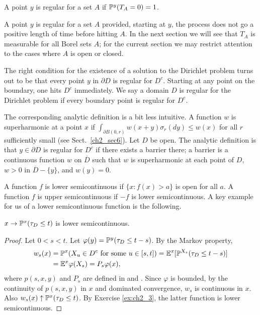 \begin{definition}\label{def:ch2_1.9}
A point $y$ is regular for a set $A$ if $\P^y(T_A = 0) = 1$.
\end{definition}

A point $y$ is regular for a set $A$ provided, starting at $y$, the process does not go a positive length of time before hitting $A$. In the next section we will see that $T_A$ is measurable for all Borel sets $A$; for the current section we may restrict attention to the cases where $A$ is open or closed.

The right condition for the existence of a solution to the Dirichlet problem turns out to be that every point $y$ in $\partial D$ is regular for $D^c$. Starting at any point on the boundary, one hits $D^c$ immediately. We say a domain $D$ is regular for the Dirichlet problem if every boundary point is regular for $D^c$.

The corresponding analytic definition is a bit less intuitive. A function $w$ is superharmonic at a point $x$ if $\int_{\partial B(0,r)} w(x + y)\sigma_r(dy) \leq w(x)$ for all $r$ sufficiently small (see Sect.\ \ref{ch2_sec6}). Let $D$ be open. The analytic definition is that $y \in \partial D$ is regular for $D^c$ if there exists a barrier there; a barrier is a continuous function $w$ on $\overline{D}$ such that $w$ is superharmonic at each point of $D$, $w > 0$ in $\overline{D} - \{y\}$, and $w(y) = 0$.

A function $f$ is lower semicontinuous if $\{x : f(x) > a\}$ is open for all $a$. A function $f$ is upper semicontinuous if $-f$ is lower semicontinuous. A key example for us of a lower semicontinuous function is the following.

\begin{proposition}\label{prop:ch2_1.10}
$x \to \P^x(\tau_D \leq t)$ is lower semicontinuous.
\end{proposition}

\begin{proof}
Let $0 < s < t$. Let $\varphi(y) = \P^y(\tau_D \leq t-s)$. By the Markov property,
\begin{align*}
    w_s(x) &= \P^x(X_u \in D^c~\text{for some}~u \in [s,t]) = \E^x[\P^{X_s}(\tau_D \leq t-s)]  \\
    &= \E^x\varphi(X_s) = P_s\varphi(x),
\end{align*}
where $p(s,x,y)$ and $P_s$ are defined in  and . Since $\varphi$ is bounded, by the continuity of $p(s,x,y)$ in $x$ and dominated convergence, $w_s$ is continuous in $x$. Also $w_s(x) \uparrow \P^x(\tau_D \leq t)$. By Exercise \ref{ex:ch2_3}, the latter function is lower semicontinuous.
\end{proof}

